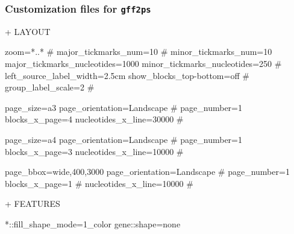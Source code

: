\documentclass[11pt]{article}
\def\nwendcode{\endtrivlist \endgroup} %
\let\nwdocspar=\par                    %
\newcommand{\subsubsctn}[1]{\subsubsection{#1}}
\def\gps{\texttt{gff2ps}}
\begin{document}
\subsubsctn{Customization files for {\gps}}

+ LAYOUT

\nwenddocs{}\endmoddef
zoom=*..*
# major_tickmarks_num=10
# minor_tickmarks_num=10
major_tickmarks_nucleotides=1000
minor_tickmarks_nucleotides=250
#
left_source_label_width=2.5cm
show_blocks_top-bottom=off
#
group_label_scale=2
#
\nwendcode{}\nwdocspar

\nwenddocs{}\endmoddef
page_size=a3
page_orientation=Landscape
# page_number=1
blocks_x_page=4
nucleotides_x_line=30000
#
\nwendcode{}\nwdocspar

\nwenddocs{}\endmoddef
page_size=a4
page_orientation=Landscape
# page_number=1
blocks_x_page=3
nucleotides_x_line=10000
#
\nwendcode{}\nwdocspar

\nwenddocs{}\endmoddef
page_bbox=wide,400,3000
page_orientation=Landscape
# page_number=1
blocks_x_page=1
# nucleotides_x_line=10000
#
\nwendcode{}\nwdocspar

+ FEATURES

\nwenddocs{}\endmoddef
*::fill_shape_mode=1_color
gene::shape=none
\nwendcode{}\nwdocspar
\end{document}
